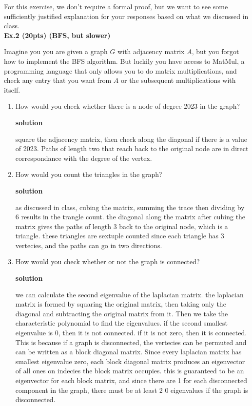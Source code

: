 \documentclass{article}
\newcommand{\sol}{\textbf{solution}}
\begin{document}
\newpage
For this exercise, we don't require a formal proof, but we want to see some sufficiently justified explanation for your responses based on what we discussed in class.\\


\noindent \textbf{Ex.2 (20pts) (BFS, but slower)}

Imagine you you are given a graph $G$ with adjacency matrix $A$, but you forgot how to implement the BFS algorithm. But luckily you have access to MatMul, a programming language that only allows you to do matrix multiplications, and check any entry that you want from $A$ or the subsequent multiplications with itself.

\begin{enumerate}
    \item How would you check whether there is a node of degree 2023 in the graph?
    
    \sol

    square the adjacency matrix, then check along the diagonal if there is a value of 2023. Paths of length two that reach back to the original node are in direct correspondance with the degree of the vertex. 

    \item How would you count the triangles in the graph?
    
    \sol

    as discussed in class, cubing the matrix, summing the trace then dividing by 6 results in the trangle count. the diagonal along the matrix after cubing the matrix gives the paths of length 3 back to the original node, which is a triangle. these triangles are sextuple counted since each triangle has 3 vertecies, and the paths can go in two directions. 

    \item How would you check whether or not the graph is connected?
    
    \sol 

    we can calculate the second eigenvalue of the laplacian matrix. the laplacian matrix is formed by squaring the original matrix, then taking only the diagonal and subtracting the original matrix from it. Then we take the characteristic polynomial to find the eigenvalues. if the second smallest eigenvalue is 0, then it is not connected. if it is not zero, then it is connected. This is because if a graph is disconnected, the vertecies can be permuted and can be written as a block diagonal matrix. Since every laplacian matrix has smallest eigenvalue zero, each block diagonal matrix produces an eigenvector of all ones on indecies the block matrix occupies. this is guaranteed to be an eigenvector for each block matrix, and since there are 1 for each disconnected component in the graph, there must be at least 2 0 eigenvalues if the graph is disconnected.


\end{enumerate}
\end{document}
